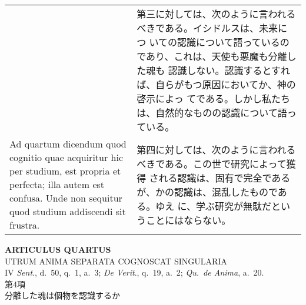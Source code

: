 \documentclass[10pt]{jsarticle} %
\begin{document}
\begin{longtable}{p{21em}p{21em}}
&第三に対しては、次のように言われるべきである。イシドルスは、未来につ
いての認識について語っているのであり、これは、天使も悪魔も分離した魂も
認識しない。認識するとすれば、自らがもつ原因においてか、神の啓示によっ
てである。しかし私たちは、自然的なものの認識について語っている。


\\




{\sc Ad quartum dicendum} quod cognitio quae acquiritur hic per
studium, est propria et perfecta; illa autem est confusa. Unde non
sequitur quod studium addiscendi sit frustra.

&

第四に対しては、次のように言われるべきである。この世で研究によって獲得
される認識は、固有で完全であるが、かの認識は、混乱したものである。ゆえ
に、学ぶ研究が無駄だということにはならない。


\end{longtable}

\newpage
{}


\begin{center}
{\Large {\bf ARTICULUS QUARTUS}}\\ {\large UTRUM ANIMA SEPARATA
COGNOSCAT SINGULARIA}\\ {\footnotesize IV {\it Sent}., d.~50, q.~1,
a.~3; {\it De Verit}., q.~19, a.~2; {\it Qu.~de Anima}, a.~20.}\\
{\Large 第4項\\分離した魂は個物を認識するか}
\end{center}
\end{document}

